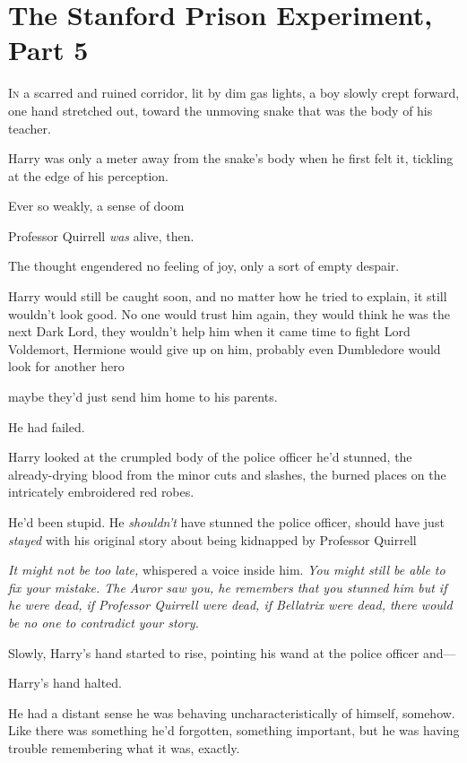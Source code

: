 \chapter{The Stanford Prison Experiment, Part 5}

\lettrine{I}{n} a scarred and
ruined corridor, lit by dim gas lights, a boy slowly crept forward, one hand
stretched out, toward the unmoving snake that was the body of his teacher.

Harry was only a meter away from the snake's body when he first felt it,
tickling at the edge of his perception.

Ever so weakly, a sense of doom{\el}

Professor Quirrell \emph{was} alive, then.

The thought engendered no feeling of joy, only a sort of empty despair.

Harry would still be caught soon, and no matter how he tried to explain, it
still wouldn't look good. No one would trust him again, they would think he was
the next Dark Lord, they wouldn't help him when it came time to fight Lord
Voldemort, Hermione would give up on him, probably even Dumbledore would look
for another hero{\el}

{\el} maybe they'd just send him home to his parents.

He had failed.

Harry looked at the crumpled body of the police officer he'd stunned, the
already-drying blood from the minor cuts and slashes, the burned places on the
intricately embroidered red robes.

He'd been stupid. He \emph{shouldn't} have stunned the police officer, should
have just \emph{stayed} with his original story about being kidnapped by
Professor Quirrell{\el}

\emph{It might not be too late,} whispered a voice inside him. \emph{You might
still be able to fix your mistake. The Auror saw you, he remembers that you
stunned him{\el} but if he were dead, if Professor Quirrell were dead, if
Bellatrix were dead, there would be no one to contradict your story.}

Slowly, Harry's hand started to rise, pointing his wand at the police officer
and—

Harry's hand halted.

He had a distant sense he was behaving uncharacteristically of himself,
somehow. Like there was something he'd forgotten, something important, but he
was having trouble remembering what it was, exactly.

